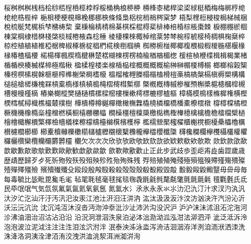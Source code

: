 桜󠄀桝󠄀桝󠄁桝󠄂桟󠄀档󠄀桧󠄀桫󠄀桮󠄀桯󠄀桰󠄀桱󠄀桲󠄀桴󠄀桵󠄀桶󠄀桷󠄀桹󠄀桺󠄀桺󠄁
桺󠄂桻󠄀桼󠄀桾󠄀桿󠄀梁󠄀梁󠄁梂󠄀梃󠄀梄󠄀梅󠄀梅󠄁梆󠄀梈󠄀梍󠄀梍󠄁梎󠄀梏󠄀梐󠄀梓󠄀
梔󠄀梖󠄀梗󠄀梗󠄁梘󠄀梙󠄀梚󠄀梛󠄀梛󠄁梜󠄀條󠄀條󠄁梟󠄀梠󠄀梡󠄀梢󠄀梢󠄁梣󠄀梥󠄀梦󠄀
梧󠄀梨󠄀梩󠄀梪󠄀梫󠄀梭󠄀梮󠄀梯󠄀械󠄀梱󠄀梲󠄀梳󠄀梴󠄀梵󠄀梶󠄀梹󠄀梺󠄀梻󠄀梼󠄀棃󠄀
棄󠄀棅󠄀棆󠄀棈󠄀棈󠄁棉󠄀棊󠄀棋󠄀棌󠄀棍󠄀棏󠄀棐󠄀棑󠄀棒󠄀棓󠄀棔󠄀棕󠄀棖󠄀棗󠄀棘󠄀
棙󠄀棚󠄀棚󠄁棜󠄀棝󠄀棟󠄀棠󠄀棡󠄀棣󠄀棤󠄀棥󠄀棧󠄀棨󠄀棪󠄀棫󠄀棬󠄀棭󠄀森󠄀棯󠄀棰󠄀
棱󠄀棲󠄀棵󠄀棶󠄀棷󠄀棹󠄀棺󠄀棻󠄀棼󠄀棽󠄀椀󠄀椁󠄀椃󠄀椄󠄀椅󠄀椆󠄀椇󠄀椈󠄀椉󠄀椊󠄀
椋󠄀椌󠄀植󠄀植󠄁植󠄂椎󠄀椏󠄀椐󠄀椑󠄀椒󠄀椓󠄀椖󠄀椗󠄀椙󠄀椚󠄀椛󠄀検󠄀椡󠄀椢󠄀椣󠄀
椥󠄀椦󠄀椨󠄀椪󠄀椰󠄀椰󠄁椱󠄀椳󠄀椴󠄀椵󠄀椶󠄀椸󠄀椹󠄀椻󠄀椽󠄀椽󠄁椿󠄀楂󠄀楅󠄀楆󠄀
楉󠄀楊󠄀楎󠄀楓󠄀楔󠄀楕󠄀楗󠄀楙󠄀楚󠄀楛󠄀楜󠄀楝󠄀楞󠄀楞󠄁楠󠄀楡󠄀楢󠄀楢󠄁楣󠄀楤󠄀
楥󠄀楦󠄀楨󠄀楩󠄀楪󠄀楫󠄀楫󠄁楬󠄀業󠄀楮󠄀楯󠄀楯󠄁楰󠄀楱󠄀楲󠄀楳󠄀楴󠄀極󠄀楷󠄀楸󠄀
楹󠄀楺󠄀楻󠄀楼󠄀楽󠄀楾󠄀楿󠄀榀󠄀榁󠄀概󠄀概󠄁概󠄂概󠄃榆󠄀榊󠄀榊󠄁榍󠄀榎󠄀榑󠄀榒󠄀
榔󠄀榔󠄁榕󠄀榖󠄀榘󠄀榛󠄀榜󠄀榠󠄀榡󠄀榥󠄀榦󠄀榧󠄀榧󠄁榨󠄀榫󠄀榭󠄀榮󠄀榯󠄀榰󠄀榱󠄀
榲󠄀榴󠄀榷󠄀榸󠄀榺󠄀榻󠄀榻󠄁榼󠄀榾󠄀榿󠄀槀󠄀槁󠄀槁󠄁槃󠄀槅󠄀槇󠄀槈󠄀槊󠄀構󠄀構󠄁
槌󠄀槌󠄁槍󠄀槎󠄀槏󠄀槐󠄀槑󠄀槓󠄀槖󠄀槗󠄀様󠄀槙󠄀槙󠄁槝󠄀槞󠄀槢󠄀槣󠄀槥󠄀槧󠄀槨󠄀
槩󠄀槪󠄀槪󠄁槫󠄀槭󠄀槮󠄀槯󠄀槱󠄀槲󠄀槳󠄀槴󠄀槵󠄀槶󠄀槹󠄀槻󠄀槽󠄀槾󠄀槾󠄁槿󠄀樀󠄀
樁󠄀樂󠄀樃󠄀樅󠄀樊󠄀樋󠄀樋󠄁樌󠄀樏󠄀樑󠄀樒󠄀樓󠄀樔󠄀樕󠄀樗󠄀標󠄀樚󠄀樛󠄀樝󠄀樞󠄀
樟󠄀樠󠄀模󠄀樢󠄀樣󠄀樤󠄀樨󠄀権󠄀横󠄀樫󠄀樮󠄀樰󠄀樲󠄀樳󠄀樴󠄀樵󠄀樶󠄀樷󠄀樸󠄀樹󠄀
樺󠄀樻󠄀樽󠄀樽󠄁樾󠄀樿󠄀橄󠄀橄󠄁橅󠄀橆󠄀橇󠄀橈󠄀橉󠄀橊󠄀橋󠄀橎󠄀橐󠄀橑󠄀橒󠄀橔󠄀
橕󠄀橕󠄁橖󠄀橘󠄀橙󠄀橛󠄀機󠄀機󠄁橡󠄀橢󠄀橤󠄀橦󠄀橧󠄀橪󠄀橫󠄀橱󠄀橲󠄀橳󠄀橳󠄁橸󠄀
橺󠄀橾󠄀橿󠄀檀󠄀檁󠄀檃󠄀檄󠄀檆󠄀檇󠄀檉󠄀檋󠄀檍󠄀檎󠄀檎󠄁檐󠄀檐󠄁檑󠄀檔󠄀檗󠄀檛󠄀
檜󠄀檜󠄁檝󠄀檞󠄀檟󠄀檠󠄀檡󠄀檢󠄀檣󠄀檥󠄀檪󠄀檫󠄀檬󠄀檮󠄀檯󠄀檰󠄀檱󠄀檳󠄀檴󠄀檸󠄀
檻󠄀檽󠄀檾󠄀檿󠄀櫁󠄀櫂󠄀櫃󠄀櫆󠄀櫈󠄀櫉󠄀櫌󠄀櫐󠄀櫑󠄀櫓󠄀櫔󠄀櫕󠄀櫖󠄀櫚󠄀櫛󠄀櫛󠄁
櫛󠄂櫜󠄀櫝󠄀櫞󠄀櫟󠄀櫢󠄀櫤󠄀櫧󠄀櫨󠄀櫪󠄀櫬󠄀櫰󠄀櫱󠄀櫲󠄀櫳󠄀櫸󠄀櫺󠄀櫻󠄀櫼󠄀櫽󠄀
欂󠄀欃󠄀欄󠄀欄󠄁欅󠄀欆󠄀欇󠄀欉󠄀權󠄀欋󠄀欏󠄀欐󠄀欑󠄀欒󠄀欖󠄀欗󠄀欛󠄀欝󠄀欝󠄁欞󠄀
欟󠄀欠󠄀次󠄀次󠄁次󠄂欣󠄀欤󠄀欤󠄁欧󠄀欨󠄀欫󠄀欬󠄀欯󠄀欲󠄀欵󠄀欶󠄀欷󠄀欸󠄀欹󠄀欺󠄀
欻󠄀欽󠄀款󠄀欿󠄀歃󠄀歆󠄀歇󠄀歉󠄀歊󠄀歌󠄀歍󠄀歎󠄀歎󠄁歐󠄀歒󠄀歓󠄀歔󠄀歖󠄀歘󠄀歙󠄀
歛󠄀歝󠄀歟󠄀歠󠄀歡󠄀止󠄀正󠄀此󠄀步󠄀武󠄀歧󠄀歩󠄀歪󠄀歫󠄀歬󠄀歮󠄀歯󠄀歰󠄀歲󠄀歳󠄀
歴󠄀歵󠄀歷󠄀歸󠄀歹󠄀歺󠄀死󠄀歽󠄀歾󠄀歿󠄀殀󠄀殁󠄀殂󠄀殃󠄀殄󠄀殅󠄀殆󠄀殉󠄀殊󠄀残󠄀
殍󠄀殕󠄀殖󠄀殖󠄁殗󠄀殘󠄀殛󠄀殞󠄀殟󠄀殠󠄀殢󠄀殣󠄀殤󠄀殨󠄀殩󠄀殪󠄀殫󠄀殬󠄀殭󠄀殮󠄀
殯󠄀殰󠄀殱󠄀殲󠄀殳󠄀殴󠄀段󠄀殷󠄀殸󠄀殹󠄀殺󠄀殺󠄁殻󠄀殻󠄁殼󠄀殽󠄀殾󠄀殿󠄀毀󠄀毃󠄀
毄󠄀毅󠄀毆󠄀毇󠄀毈󠄀毉󠄀毋󠄀毌󠄀母󠄀毎󠄀每󠄀毒󠄀毓󠄀比󠄀毖󠄀毗󠄀毘󠄀毚󠄀毛󠄀毟󠄀
毡󠄀毣󠄀毦󠄀毧󠄀毫󠄀毬󠄀毮󠄀毯󠄀毱󠄀毳󠄀毷󠄀毹󠄀毿󠄀氂󠄀氄󠄀氅󠄀氈󠄀氈󠄁氈󠄂氉󠄀
氊󠄀氍󠄀氎󠄀氏󠄀氐󠄀民󠄀氒󠄀氓󠄀氓󠄁气󠄀気󠄀氙󠄀氛󠄀氟󠄀氣󠄀氤󠄀氦󠄀氧󠄀氨󠄀氬󠄀
氮󠄀氳󠄀水󠄀氵󠄀氶󠄀氷󠄀永󠄀永󠄁氺󠄀氺󠄁氻󠄀氾󠄀氿󠄀汀󠄀汁󠄀求󠄀汊󠄀汋󠄀汍󠄀汎󠄀
汏󠄀汐󠄀汒󠄀汔󠄀汕󠄀汗󠄀汙󠄀汚󠄀汛󠄀汜󠄀汝󠄀汞󠄀江󠄀池󠄀汢󠄀汧󠄀汨󠄀汪󠄀汫󠄀汭󠄀
汯󠄀汰󠄀汲󠄀汲󠄁汳󠄀汴󠄀汶󠄀汸󠄀汹󠄀決󠄀汻󠄀汽󠄀汾󠄀沁󠄀沂󠄀沃󠄀沄󠄀沅󠄀沆󠄀沇󠄀
沈󠄀沉󠄀沌󠄀沍󠄀沐󠄀沒󠄀沓󠄀沔󠄀沕󠄀沖󠄀沗󠄀沘󠄀沙󠄀沚󠄀沛󠄀沜󠄀沟󠄀没󠄀沢󠄀沪󠄀
沪󠄁沪󠄂沫󠄀沬󠄀沭󠄀沮󠄀沰󠄀沱󠄀沲󠄀河󠄀沴󠄀沸󠄀油󠄀沺󠄀治󠄀沼󠄀沽󠄀沾󠄀沿󠄀沿󠄁
沿󠄂況󠄀泂󠄀泄󠄀泅󠄀泆󠄀泉󠄀泊󠄀泌󠄀泍󠄀泏󠄀泐󠄀泑󠄀泒󠄀泓󠄀泔󠄀法󠄀泖󠄀泗󠄀泙󠄀
泚󠄀泛󠄀泜󠄀泝󠄀泠󠄀泡󠄀泡󠄁波󠄀泣󠄀泥󠄀泧󠄀注󠄀注󠄁注󠄂泩󠄀泪󠄀泫󠄀泬󠄀泭󠄀泮󠄀
泯󠄀泰󠄀泱󠄀泲󠄀泳󠄀泴󠄀泻󠄀洀󠄀洁󠄀洄󠄀洇󠄀洊󠄀洋󠄀洌󠄀洎󠄀洏󠄀洑󠄀洒󠄀洓󠄀洗󠄀
洙󠄀洚󠄀洛󠄀洞󠄀洟󠄀洤󠄀津󠄀洦󠄀洧󠄀洨󠄀洩󠄀洪󠄀洫󠄀洮󠄀洯󠄀洱󠄀洲󠄀洳󠄀洴󠄀洵󠄀
